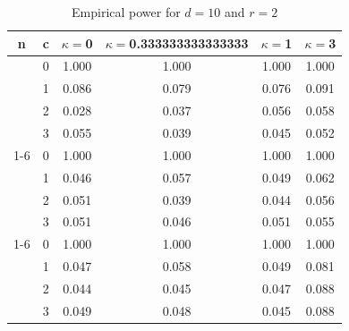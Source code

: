 \documentclass[oneside,11pt]{article}
\begin{document}
\begin{table}[H]
\centering
\caption{Empirical power for $d = 10$ and $r = 2$}
\centering
\begin{tabular}[t]{cccccc}
\toprule
n & c & $\kappa = $0 & $\kappa = $0.333333333333333 & $\kappa = $1 & $\kappa = $3\\
\midrule
 & 0 & 1.000 & 1.000 & 1.000 & 1.000\\

 & 1 & 0.086 & 0.079 & 0.076 & 0.091\\

 & 2 & 0.028 & 0.037 & 0.056 & 0.058\\

\multirow{-4}{*}{\centering\arraybackslash 10} & 3 & 0.055 & 0.039 & 0.045 & 0.052\\
\cmidrule{1-6}
 & 0 & 1.000 & 1.000 & 1.000 & 1.000\\

 & 1 & 0.046 & 0.057 & 0.049 & 0.062\\

 & 2 & 0.051 & 0.039 & 0.044 & 0.056\\

\multirow{-4}{*}{\centering\arraybackslash 50} & 3 & 0.051 & 0.046 & 0.051 & 0.055\\
\cmidrule{1-6}
 & 0 & 1.000 & 1.000 & 1.000 & 1.000\\

 & 1 & 0.047 & 0.058 & 0.049 & 0.081\\

 & 2 & 0.044 & 0.045 & 0.047 & 0.088\\

\multirow{-4}{*}{\centering\arraybackslash 100} & 3 & 0.049 & 0.048 & 0.045 & 0.088\\
\bottomrule
\end{tabular}
\end{table}
\end{document}
